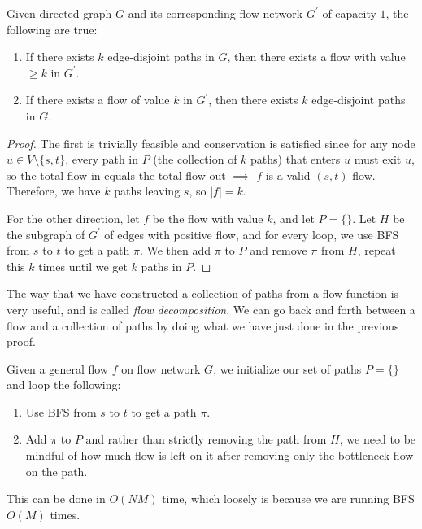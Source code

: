 \documentclass{article}
\begin{document}
    \begin{theorem}
      Given directed graph $G$ and its corresponding flow network $G^\prime$ of capacity $1$, the following are true: 
      \begin{enumerate}
        \item If there exists $k$ edge-disjoint paths in $G$, then there exists a flow with value $\geq k$ in $G^\prime$. 
        \item If there exists a flow of value $k$ in $G^\prime$, then there exists $k$ edge-disjoint paths in $G$. 
      \end{enumerate}
    \end{theorem}
    \begin{proof}
      The first is trivially feasible and conservation is satisfied since for any node $u \in V \setminus \{s, t\}$, every path in $P$ (the collection of $k$ paths) that enters $u$ must exit $u$, so the total flow in equals the total flow out $\implies$ $f$ is a valid $(s, t)$-flow. Therefore, we have $k$ paths leaving $s$, so $|f| = k$. 

      For the other direction, let $f$ be the flow with value $k$, and let $P = \{\}$. Let $H$ be the subgraph of $G^\prime$ of edges with positive flow, and for every loop, we use BFS from $s$ to $t$ to get a path $\pi$. We then add $\pi$ to $P$ and remove $\pi$ from $H$, repeat this $k$ times until we get $k$ paths in $P$.  
    \end{proof} 

    The way that we have constructed a collection of paths from a flow function is very useful, and is called \textit{flow decomposition}. We can go back and forth between a flow and a collection of paths by doing what we have just done in the previous proof. 

    \begin{definition}
      Given a general flow $f$ on flow network $G$, we initialize our set of paths $P = \{\}$ and loop the following: 
      \begin{enumerate}
        \item Use BFS from $s$ to $t$ to get a path $\pi$. 
        \item Add $\pi$ to $P$ and rather than strictly removing the path from $H$, we need to be mindful of how much flow is left on it after removing only the bottleneck flow on the path. 
      \end{enumerate}
      This can be done in $O(NM)$ time, which loosely is because we are running BFS $O(M)$ times. 
    \end{definition}
\end{document}
